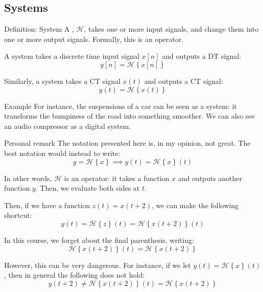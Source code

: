 \documentclass[a4paper]{article}
\begin{document}
\subsection{Systems}
\begin{parag}{Definition: System}
   A , $\mathcal{H}$, takes one or more input signals, and change them into one or more output signals. Formally, this is an operator.

   A  system takes a discrete time input signal $x\left[n\right]$ and outputs a DT signal: 
   \[y\left[n\right] = \mathcal{H}\left\{x\left[n\right]\right\}\]
   
   Similarly, a  system takes a CT signal $x\left(t\right)$ and outputs a CT signal: 
   \[y\left(t\right) = \mathcal{H}\left\{x\left(t\right)\right\}\]
   
    \begin{subparag}{Example}
       For instance, the suspensions of a car can be seen as a system: it transforms the bumpiness of the road into something smoother. We can also see an audio compressor as a digital system.
    \end{subparag}

    \begin{subparag}{Personal remark}
       The notation presented here is, in my opinion, not great. The best notation would instead to write: 
       \[y = \mathcal{H}\left\{x\right\} \implies y\left(t\right) = \mathcal{H}\left\{x\right\}\left(t\right)\]

       In other words, $\mathcal{H}$ is an operator: it takes a function $x$ and outputs another function $y$. Then, we evaluate both sides at $t$.
       
       Then, if we have a function $z\left(t\right) = x\left(t+2\right)$, we can make the following shortcut: 
       \[y\left(t\right) = \mathcal{H}\left\{z\right\}\left(t\right) = \mathcal{H}\left\{x\left(t+2\right)\right\}\left(t\right)\]
       
       In this course, we forget about the final parenthesis, writing: 
       \[\mathcal{H}\left\{x\left(t+2\right)\right\}\left(t\right) = \mathcal{H}\left\{x\left(t+2\right)\right\}\]
       
       However, this can be very dangerous. For instance, if we let $y\left(t\right) = \mathcal{H}\left\{x\right\}\left(t\right)$, then in general the following does not hold: 
       \[y\left(t+2\right) \neq \mathcal{H}\left\{x\left(t + 2\right)\right\}\left(t\right) = \mathcal{H}\left\{x\left(t+2\right)\right\}\]


\end{subparag}
\end{parag}
\end{document}
